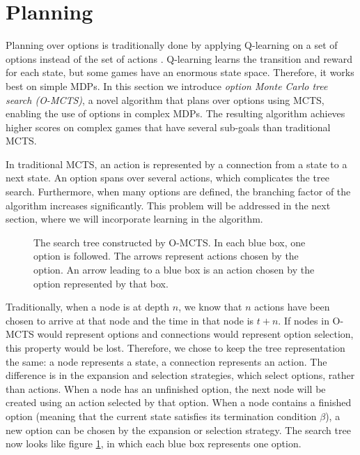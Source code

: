 \section{Planning}
\label{sec:planning}


Planning over options is traditionally done by applying Q-learning on a set of
options instead of the set of actions \cite{sutton1999between}. Q-learning
learns the transition and reward for each state, but some games have an
enormous state space. Therefore, it works best on simple MDPs. In this section
we introduce \emph{option Monte Carlo tree search (O-MCTS)}, a novel algorithm
that plans over options using MCTS, enabling the use of options in complex MDPs.
The resulting algorithm achieves higher scores on complex games that have
several sub-goals than traditional MCTS.

In traditional MCTS, an action is represented by a connection from a state to a
next state. An option spans over several actions, which complicates the tree
search. Furthermore, when many options are defined, the branching factor of
the algorithm increases significantly. This problem will be addressed in the
next section, where we will incorporate learning in the algorithm.

\begin{figure}
	\centering
	\caption{The search tree constructed by O-MCTS. In each blue box, one option
	is followed. The arrows represent actions chosen by the option. An arrow
leading to a blue box is an action chosen by the option represented by that box.}
	\label{fig:omcts-tree}
\end{figure}

Traditionally, when a node is at depth $n$, we know that $n$ actions have been
chosen to arrive at that node and the time in that node is $t+n$. 
If nodes in O-MCTS would represent options and connections would represent
option selection, this property would be lost. Therefore, we chose to keep
the tree representation the same: a node represents a state, a connection
represents an action. The difference is in the expansion and selection
strategies, which select options, rather than actions. When a node has an
unfinished option, the next node will be created using an action selected by
that option. When a node contains a finished option (meaning that the
current state satisfies its termination condition $\beta$), a new option can be
chosen by the expansion or selection strategy. The search tree now looks like
figure \ref{fig:omcts-tree}, in which each blue box represents one option. 

